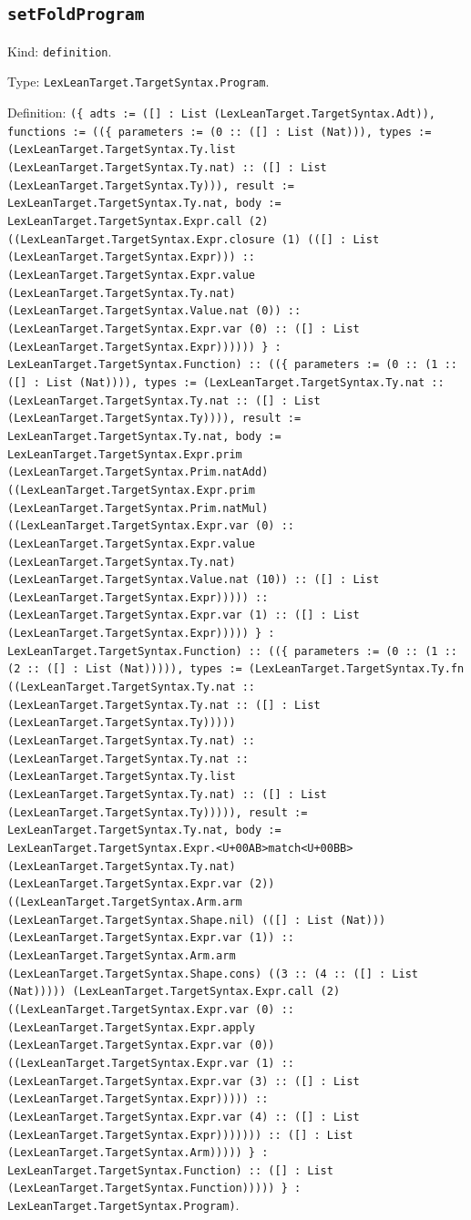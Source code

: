 \documentclass[11pt]{article}
\begin{document}
\subsection*{\texttt{setFoldProgram}}
\noindent Kind: \texttt{definition}.\par
\noindent Type: \texttt{LexLeanTarget.TargetSyntax.Program}.\par
\noindent Definition: \texttt{(\{ adts := ([] : List (LexLeanTarget.TargetSyntax.Adt)), functions := ((\{ parameters := (0 :: ([] : List (Nat))), types := (LexLeanTarget.TargetSyntax.Ty.list (LexLeanTarget.TargetSyntax.Ty.nat) :: ([] : List (LexLeanTarget.TargetSyntax.Ty))), result := LexLeanTarget.TargetSyntax.Ty.nat, body := LexLeanTarget.TargetSyntax.Expr.call (2) ((LexLeanTarget.TargetSyntax.Expr.closure (1) (([] : List (LexLeanTarget.TargetSyntax.Expr))) :: (LexLeanTarget.TargetSyntax.Expr.value (LexLeanTarget.TargetSyntax.Ty.nat) (LexLeanTarget.TargetSyntax.Value.nat (0)) :: (LexLeanTarget.TargetSyntax.Expr.var (0) :: ([] : List (LexLeanTarget.TargetSyntax.Expr)))))) \} : LexLeanTarget.TargetSyntax.Function) :: ((\{ parameters := (0 :: (1 :: ([] : List (Nat)))), types := (LexLeanTarget.TargetSyntax.Ty.nat :: (LexLeanTarget.TargetSyntax.Ty.nat :: ([] : List (LexLeanTarget.TargetSyntax.Ty)))), result := LexLeanTarget.TargetSyntax.Ty.nat, body := LexLeanTarget.TargetSyntax.Expr.prim (LexLeanTarget.TargetSyntax.Prim.natAdd) ((LexLeanTarget.TargetSyntax.Expr.prim (LexLeanTarget.TargetSyntax.Prim.natMul) ((LexLeanTarget.TargetSyntax.Expr.var (0) :: (LexLeanTarget.TargetSyntax.Expr.value (LexLeanTarget.TargetSyntax.Ty.nat) (LexLeanTarget.TargetSyntax.Value.nat (10)) :: ([] : List (LexLeanTarget.TargetSyntax.Expr))))) :: (LexLeanTarget.TargetSyntax.Expr.var (1) :: ([] : List (LexLeanTarget.TargetSyntax.Expr))))) \} : LexLeanTarget.TargetSyntax.Function) :: ((\{ parameters := (0 :: (1 :: (2 :: ([] : List (Nat))))), types := (LexLeanTarget.TargetSyntax.Ty.fn ((LexLeanTarget.TargetSyntax.Ty.nat :: (LexLeanTarget.TargetSyntax.Ty.nat :: ([] : List (LexLeanTarget.TargetSyntax.Ty))))) (LexLeanTarget.TargetSyntax.Ty.nat) :: (LexLeanTarget.TargetSyntax.Ty.nat :: (LexLeanTarget.TargetSyntax.Ty.list (LexLeanTarget.TargetSyntax.Ty.nat) :: ([] : List (LexLeanTarget.TargetSyntax.Ty))))), result := LexLeanTarget.TargetSyntax.Ty.nat, body := LexLeanTarget.TargetSyntax.Expr.<U+00AB>match<U+00BB> (LexLeanTarget.TargetSyntax.Ty.nat) (LexLeanTarget.TargetSyntax.Expr.var (2)) ((LexLeanTarget.TargetSyntax.Arm.arm (LexLeanTarget.TargetSyntax.Shape.nil) (([] : List (Nat))) (LexLeanTarget.TargetSyntax.Expr.var (1)) :: (LexLeanTarget.TargetSyntax.Arm.arm (LexLeanTarget.TargetSyntax.Shape.cons) ((3 :: (4 :: ([] : List (Nat))))) (LexLeanTarget.TargetSyntax.Expr.call (2) ((LexLeanTarget.TargetSyntax.Expr.var (0) :: (LexLeanTarget.TargetSyntax.Expr.apply (LexLeanTarget.TargetSyntax.Expr.var (0)) ((LexLeanTarget.TargetSyntax.Expr.var (1) :: (LexLeanTarget.TargetSyntax.Expr.var (3) :: ([] : List (LexLeanTarget.TargetSyntax.Expr))))) :: (LexLeanTarget.TargetSyntax.Expr.var (4) :: ([] : List (LexLeanTarget.TargetSyntax.Expr))))))) :: ([] : List (LexLeanTarget.TargetSyntax.Arm))))) \} : LexLeanTarget.TargetSyntax.Function) :: ([] : List (LexLeanTarget.TargetSyntax.Function))))) \} : LexLeanTarget.TargetSyntax.Program)}.\par
\end{document}
